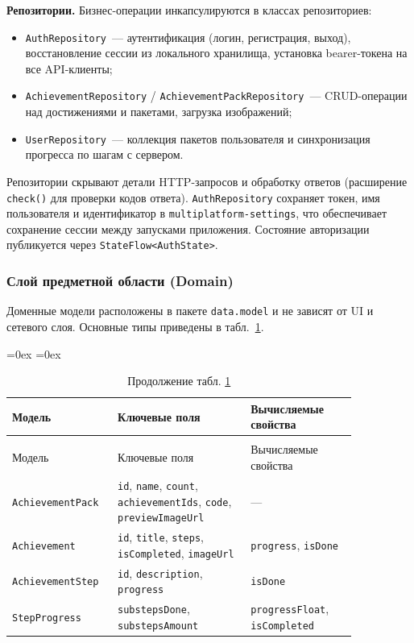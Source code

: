 \documentclass[../main.tex]{subfiles}
\begin{document}
\textbf{Репозитории.} Бизнес-операции инкапсулируются в классах репозиториев:
\begin{itemize}[leftmargin=*]
	\item \texttt{AuthRepository}~--- аутентификация (логин, регистрация, выход), восстановление сессии из локального хранилища, установка bearer-токена на все API-клиенты;
	\item \texttt{AchievementRepository} / \texttt{AchievementPackRepository}~--- CRUD-операции над достижениями и пакетами, загрузка изображений;
	\item \texttt{UserRepository}~--- коллекция пакетов пользователя и синхронизация прогресса по шагам с сервером.
\end{itemize}

Репозитории скрывают детали HTTP-запросов и обработку ответов (расширение \texttt{check()} для проверки кодов ответа). \texttt{AuthRepository} сохраняет токен, имя пользователя и идентификатор в \texttt{multiplatform-settings}, что обеспечивает сохранение сессии между запусками приложения. Состояние авторизации публикуется через \texttt{StateFlow<AuthState>}.

\subsubsection{Слой предметной области (Domain)}

Доменные модели расположены в пакете \texttt{data.model} и не зависят от UI и сетевого слоя. Основные типы приведены в табл.~\ref{tab:domain-models}.

\aboverulesep=0ex
\belowrulesep=0ex
\begin{small}
\begin{longtable}[t]{
	|>{\raggedright}p{0.22\linewidth} |
	>{\raggedright}p{0.35\linewidth} |
	>{\raggedright\arraybackslash}p{0.28\linewidth}|
}
\caption{Доменные модели приложения Achi} \label{tab:domain-models}\\
\midrule
Модель & Ключевые поля & Вычисляемые свойства \\
\midrule
\endfirsthead
\caption*{Продолжение табл. \ref{tab:domain-models}\raggedleft}\\\midrule
Модель & Ключевые поля & Вычисляемые свойства \\
\midrule
\endhead
\midrule
\endfoot
\midrule
\endlastfoot
\texttt{AchievementPack} & \texttt{id}, \texttt{name}, \texttt{count}, \texttt{achievementIds}, \texttt{code}, \texttt{previewImageUrl} & --- \\
\midrule
\texttt{Achievement} & \texttt{id}, \texttt{title}, \texttt{steps}, \texttt{isCompleted}, \texttt{imageUrl} & \texttt{progress}, \texttt{isDone} \\
\midrule
\texttt{AchievementStep} & \texttt{id}, \texttt{description}, \texttt{progress} & \texttt{isDone} \\
\midrule
\texttt{StepProgress} & \texttt{substepsDone}, \texttt{substepsAmount} & \texttt{progressFloat}, \texttt{isCompleted} \\
\end{longtable}
\end{small}
\end{document}

